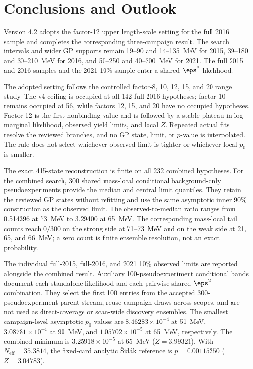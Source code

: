 \section{Conclusions and Outlook}
\label{sec:conclusions}

Version 4.2 adopts the factor-12 upper length-scale setting for the full 2016
sample and completes the corresponding three-campaign result. The search
intervals and wider GP supports remain 19--90 and 14--135~MeV for 2015, 39--180
and 30--210~MeV for 2016, and 50--250 and 40--300~MeV for 2021. The full 2015
and 2016 samples and the 2021 10\% sample enter a shared-$\eps^2$ likelihood.

The adopted setting follows the controlled factor-8, 10, 12, 15, and 20 range
study. The v4 ceiling is occupied at all 142 full-2016 hypotheses; factor 10
remains occupied at 56, while factors 12, 15, and 20 have no occupied
hypotheses. Factor 12 is the first nonbinding value and is followed by a stable
plateau in log marginal likelihood, observed yield limits, and local $Z$.
Repeated actual fits resolve the reviewed branches, and no GP state, limit, or
$p$-value is interpolated. The rule does not select whichever observed limit is
tighter or whichever local $p_0$ is smaller.

The exact 415-state reconstruction is finite on all 232 combined hypotheses.
For the combined search, 300 shared mass-local conditional background-only
pseudoexperiments provide the median and central limit quantiles. They retain the
reviewed GP states without refitting and use the same asymptotic inner 90\%
\CLs{} construction as the observed limit. The observed-to-median ratio ranges
from 0.514396 at 73~MeV to 3.29400 at 65~MeV. The corresponding mass-local tail
counts reach $0/300$ on the strong side at 71--73~MeV and on the weak side at
21, 65, and 66~MeV; a zero count is finite ensemble resolution, not an exact
probability.

The individual full-2015, full-2016, and 2021 10\% observed limits are reported
alongside the combined result. Auxiliary 100-pseudoexperiment conditional bands
document each standalone likelihood and each pairwise shared-$\eps^2$
combination. They select the first 100 entries from the accepted
300-pseudoexperiment parent stream, reuse campaign draws across scopes, and are
not used as direct-coverage or scan-wide discovery ensembles. The smallest
campaign-level asymptotic $p_0$ values are
$8.46283\times10^{-4}$ at 51~MeV, $3.08781\times10^{-4}$ at 90~MeV, and
$1.05702\times10^{-5}$ at 65~MeV, respectively. The combined minimum is
$3.25918\times10^{-5}$ at 65~MeV ($Z=3.99321$). With
$N_{\mathrm{eff}}=35.3814$, the fixed-card analytic \v{S}id\'ak reference is
$p=0.00115250$ ($Z=3.04783$).

